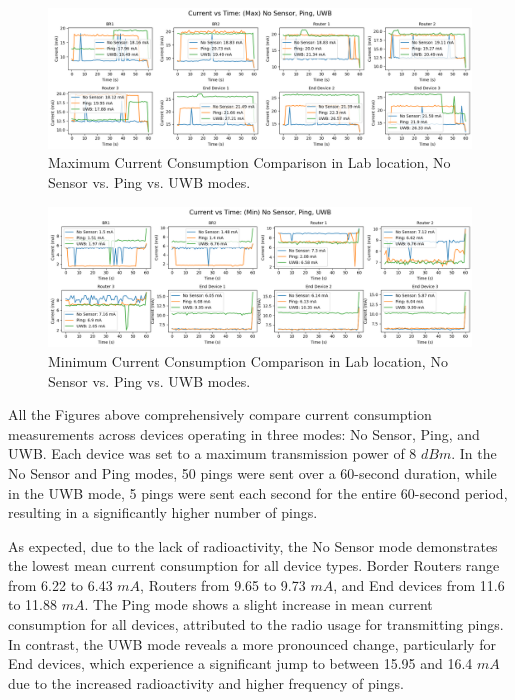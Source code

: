 \begin{figure}[H]
  \includegraphics[width=1\textwidth]{images/research_results/current_consumption_analysis/maximum/lab/max_comparison_no-sensor_vs_ping_vs_uwb.png}
  \caption{Maximum Current Consumption Comparison in Lab location, No Sensor vs. Ping vs. UWB modes.}
  \label{fig:max_comparison_no-sensor_vs_ping_vs_uwb_lab}
\end{figure}

\begin{figure}[H]
  \centering
  \includegraphics[width=1\textwidth]{images/research_results/current_consumption_analysis/maximum/lab/min_comparison_no-sensor_vs_ping_vs_uwb.png}
  \caption{Minimum Current Consumption Comparison in Lab location, No Sensor vs. Ping vs. UWB modes.}
  \label{fig:min_comparison_no-sensor_vs_ping_vs_uwb_lab}
\end{figure}

All the Figures above comprehensively compare current consumption measurements across devices operating in three modes: No Sensor, Ping, and UWB. Each device was set to a maximum transmission power of 8 $dBm$. In the No Sensor and Ping modes, 50 pings were sent over a 60-second duration, while in the UWB mode, 5 pings were sent each second for the entire 60-second period, resulting in a significantly higher number of pings.

As expected, due to the lack of radioactivity, the No Sensor mode demonstrates the lowest mean current consumption for all device types. Border Routers range from 6.22 to 6.43 $mA$, Routers from 9.65 to 9.73 $mA$, and End devices from 11.6 to 11.88 $mA$. The Ping mode shows a slight increase in mean current consumption for all devices, attributed to the radio usage for transmitting pings. In contrast, the UWB mode reveals a more pronounced change, particularly for End devices, which experience a significant jump to between 15.95 and 16.4 $mA$ due to the increased radioactivity and higher frequency of pings.

